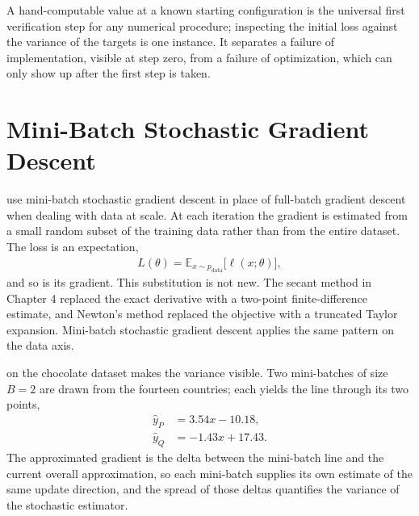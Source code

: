 A hand-computable value at a known starting configuration is the universal first verification step for any numerical procedure;
inspecting the initial loss against the variance of the targets is one instance.
It separates a failure of implementation, visible at step zero, from a failure of optimization, which can only show up after the first step is taken.






\newpage
\section{Mini-Batch Stochastic Gradient Descent}



 use mini-batch stochastic gradient descent in place of 
full-batch gradient descent when dealing with data at scale.
At each iteration the gradient is estimated from a small random subset 
of the training data rather than from the entire dataset.
The loss is an expectation,
\begin{align*}
    L(\theta) = \mathbb{E}_{x \sim p_{\text{data}}} \big[ \ell(x; \theta) \big],
\end{align*}
and so is its gradient.
This substitution is not new.
The secant method in Chapter 4 replaced the exact derivative with a two-point finite-difference estimate,
and Newton's method replaced the objective with a truncated Taylor expansion.
Mini-batch stochastic gradient descent applies the same pattern on the data axis.

 on the chocolate dataset makes the variance visible.
Two mini-batches of size $B = 2$ are drawn from the fourteen countries; each yields the line through its two points,
\begin{align*}
    \hat{y}_P &= 3.54 x - 10.18, \\
    \hat{y}_Q &= -1.43 x + 17.43.
\end{align*}
The approximated gradient is the delta between the mini-batch line and the current overall approximation,
so each mini-batch supplies its own estimate of the same update direction,
and the spread of those deltas quantifies the variance of the stochastic estimator.


